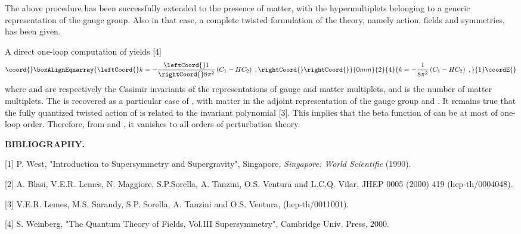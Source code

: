 \documentclass[a4paper,a4paper]{article}
\begin{document}
The above procedure has been successfully extended to the presence of matter, with the hypermultiplets belonging to a generic representation  of the gauge group. Also in that case, a complete twisted formulation of the theory, namely action, fields and symmetries, has been given. 

A direct one-loop computation of \coordHE{} yields [4] 
\begin{eqnarray}\coord{}\boxAlignEqnarray{\leftCoord{}
k=-\frac{\leftCoord{}1}{\rightCoord{}8\pi ^2}\left( C_1-H C_2\right) \;, \nonumber\rightCoord{}
\rightCoord{}}{0mm}{2}{4}{
k=-\frac{1}{8\pi ^2}\left( C_1-H C_2\right) \;, }{1}\coordE{}\end{eqnarray}
where \coordHE{} and \coordHE{} are respectively the Casimir invariants of the
representations of gauge and matter \coordHE{} multiplets, and \coordHE{} is the number
of matter multiplets.  The \coordHE{} is recovered as a particular case of \coordHE{}, with matter in the adjoint representation of the gauge group and \coordHE{}. It remains true that the fully quantized 
twisted action of \coordHE{} is related to the invariant polynomial \coordHE{} [3]. This implies that the beta function of \coordHE{} can be at most of one-loop order. Therefore, from \coordHE{} and \coordHE{}, it vanishes to all orders of perturbation theory.
 


\vspace{4mm}

{\bf BIBLIOGRAPHY.}

[1] P. West, "Introduction to Supersymmetry and Supergravity", Singapore, {\it Singapore: World 
Scientific} (1990).

[2] A. Blasi, V.E.R. Lemes, N. Maggiore, S.P.Sorella, A. Tanzini, O.S. Ventura and  
L.C.Q. Vilar, JHEP 0005 (2000) 419 (hep-th/0004048).

[3] V.E.R. Lemes, M.S. Sarandy, S.P. Sorella, A. Tanzini and O.S. Ventura, (hep-th/0011001).

[4] S. Weinberg, "The Quantum Theory of Fields, Vol.III Supersymmetry", Cambridge Univ. Press, 2000.  



\enddocument




\bye
\end{document}
